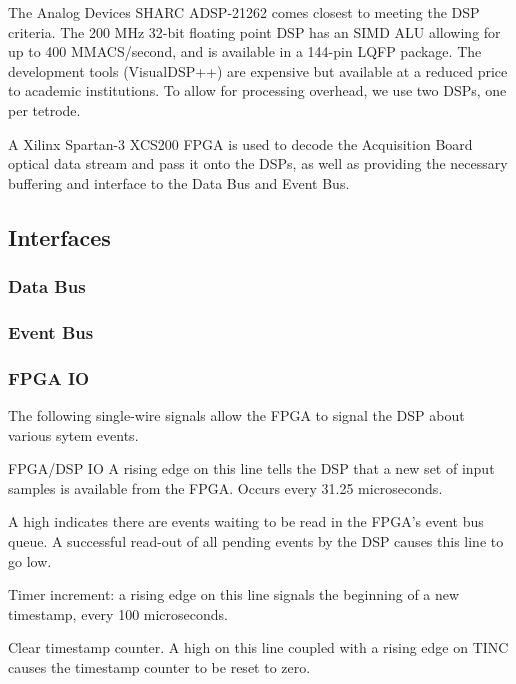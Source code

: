 \documentclass{article}
\begin{document}
 The Analog Devices SHARC ADSP-21262 comes closest to meeting
the DSP criteria. The 200 MHz 32-bit floating point DSP has an SIMD
ALU allowing for up to 400 MMACS/second, and is available in a 144-pin
LQFP package. The development tools (VisualDSP++) are expensive but
available at a reduced price to academic institutions. To allow for
processing overhead, we use two DSPs, one per tetrode.  
      
A Xilinx Spartan-3 XCS200 FPGA is used to decode the Acquisition Board
optical data stream and pass it onto the DSPs, as well as providing
the necessary buffering and interface to the Data Bus and Event Bus.
      
\subsection{Interfaces}

\subsubsection{Data Bus}

\subsubsection{Event Bus}

\subsubsection{FPGA IO}
The following single-wire signals allow the FPGA to
signal the DSP about various sytem events. 


\begin{SignalTable}{FPGA/DSP IO}
  {A rising edge on this line tells the DSP that a
    new set of input samples is available from the
    FPGA. Occurs  every 31.25 microseconds.
  }
  
  {A high indicates there are events waiting to be
    read in the FPGA's event bus queue. A successful
    read-out of all pending events by the DSP causes this
    line to go low. 
  }
        
  {Timer increment: a rising edge on this line
    signals the beginning of a new timestamp, every 100
    microseconds. 
  }
        
  {Clear timestamp counter. A high on this line
    coupled with a rising edge on TINC causes the timestamp
    counter to be reset to zero.
  }
\end{SignalTable}
\end{document}
